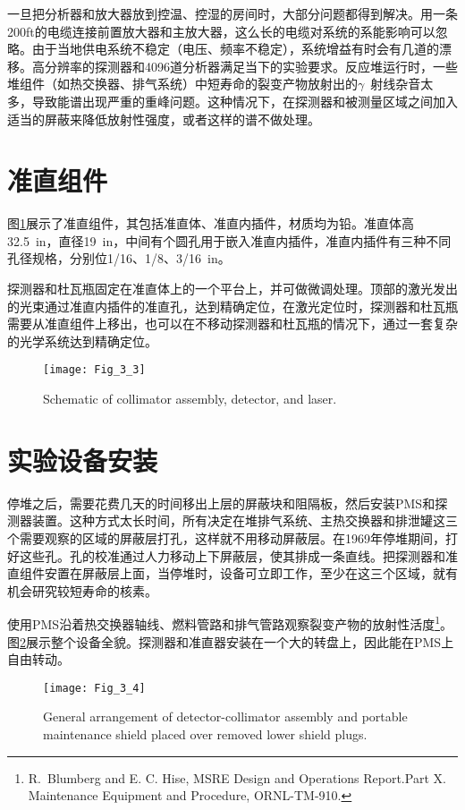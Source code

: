 一旦把分析器和放大器放到控温、控湿的房间时，大部分问题都得到解决。用一条200ft的电缆连接前置放大器和主放大器，这么长的电缆对系统的系能影响可以忽略。由于当地供电系统不稳定（电压、频率不稳定），系统增益有时会有几道的漂移。高分辨率的探测器和4096道分析器满足当下的实验要求。反应堆运行时，一些堆组件（如热交换器、排气系统）中短寿命的裂变产物放射出的$\gamma$\ 射线杂音太多，导致能谱出现严重的重峰问题。这种情况下，在探测器和被测量区域之间加入适当的屏蔽来降低放射性强度，或者这样的谱不做处理。

\section{准直组件}

图\ref{Fig_3_3}展示了准直组件，其包括准直体、准直内插件，材质均为铅。准直体高32.5\ in，直径19\ in，中间有个圆孔用于嵌入准直内插件，准直内插件有三种不同孔径规格，分别位1/16、1/8、3/16\ in。

探测器和杜瓦瓶固定在准直体上的一个平台上，并可做微调处理。顶部的激光发出的光束通过准直内插件的准直孔，达到精确定位，在激光定位时，探测器和杜瓦瓶需要从准直组件上移出，也可以在不移动探测器和杜瓦瓶的情况下，通过一套复杂的光学系统达到精确定位。

\begin{figure}
\centering
\texttt{[image: Fig\_3\_3]}
\caption{Schematic of collimator assembly, detector, and laser.}
\label{Fig_3_3}
\end{figure}

\section{实验设备安装}

停堆之后，需要花费几天的时间移出上层的屏蔽块和阻隔板，然后安装PMS和探测器装置。这种方式太长时间，所有决定在堆排气系统、主热交换器和排泄罐这三个需要观察的区域的屏蔽层打孔，这样就不用移动屏蔽层。在1969年停堆期间，打好这些孔。孔的校准通过人力移动上下屏蔽层，使其排成一条直线。把探测器和准直组件安置在屏蔽层上面，当停堆时，设备可立即工作，至少在这三个区域，就有机会研究较短寿命的核素。

使用PMS沿着热交换器轴线、燃料管路和排气管路观察裂变产物的放射性活度\footnote{R.\ Blumberg and E. C. Hise, MSRE Design and Operations Report.Part X. Maintenance Equipment and Procedure, ORNL-TM-910.}。图\ref{Fig_3_4}展示整个设备全貌。探测器和准直器安装在一个大的转盘上，因此能在PMS上自由转动。

\begin{figure}
\centering
\texttt{[image: Fig\_3\_4]}
\caption{General arrangement of detector-collimator assembly and portable maintenance shield placed over removed lower shield plugs.}
\label{Fig_3_4}
\end{figure}

